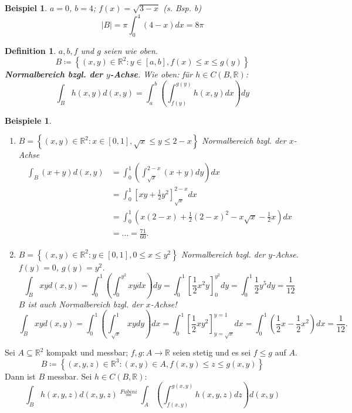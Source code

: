 \documentclass[12pt]{extreport} %
\newcommand{\R}{\mathbb{R}}
\theoremstyle{named}
\theoremstyle{nnamed}
\theoremstyle{itshape}
\newtheorem*{definition}{Definition}
\theoremstyle{normal}
\newtheorem*{beispiel*}{Beispiel}
\newtheorem*{beispiele}{Beispiele}
\begin{document}
\begin{beispiel*}
	$a = 0$, $b = 4$; $f(x) = \sqrt{3 - x}$ (s. Bsp. b)
	$$ |B| = \pi \int_{0}^{4} (4 - x) dx = 8 \pi $$	
\end{beispiel*}

\begin{definition}
	$a, b, f$ und $g$ seien wie oben.
	$$ B \coloneqq \left\{ (x, y) \in \R^{2} \colon y \in [a, b], f(x) \leq x \leq g(y) \right\} $$
	\textbf{Normalbereich bzgl. der $y$-Achse}. Wie oben: für $h \in C(B, \R)$:
	$$ \int_{B} h(x, y) d(x, y) = \int_{a}^{b} \left( \int_{f(y)}^{g(y)} h(x, y) dx \right) dy $$ %
\end{definition}


\begin{beispiele} ~\
	\begin{enumerate}
		\item $B = \left\{ (x, y) \in \R^{2} \colon x \in [0, 1], \sqrt{x} \leq y \leq 2 - x \right\}$ Normalbereich bzgl. der $x$-Achse
			\begin{align*} %
				\int_{B} (x + y) d(x, y) & = \int_{0}^{1} \left( \int_{\sqrt{x}}^{2-x} (x+y) dy \right) dx \\
				& = \int_{0}^{1} \left[ xy + \frac{1}{2} y^{2} \right]_{\sqrt{x}}^{2-x} dx \\
				& = \int_{0}^{1} \left( x ( 2 - x) + \frac{1}{2} \left( 2 - x \right)^{2} - x \sqrt{x} - \frac{1}{2} x \right) dx \\
				& = \dotsc = \frac{71}{60}.
			\end{align*} 
		\item $B = \left\{ (x, y) \in \R^{2} \colon y \in [0, 1], 0 \leq x \leq y^{2} \right\}$ Normalbereich bzgl. der $y$-Achse. $f(y) = 0$, $g(y) = y^{2}$.
			$$ \int_{B} xy d(x, y) = \int_{0}^{1} \left( \int_{0}^{y^{2}} xy dx \right) dy = \int_{0}^{1} \left[ \frac{1}{2} x^{2} y \right]_{0}^{y^{2}} dy = \int_{0}^{1} \frac{1}{2} y^{5} dy = \frac{1}{12} $$ %
			$B$ ist auch Normalbereich bzgl. der $x$-Achse! %
			$$ \int_{B} xy d(x, y) = \int_{0}^{1} \left( \int_{\sqrt{x}}^{1} xy dy \right) dx = \int_{0}^{1} \left[ \frac{1}{2} x y^{2} \right]_{y=\sqrt{x}}^{y=1} dx = \int_{0}^{1} \left( \frac{1}{2} x - \frac{1}{2} x^{2} \right) dx = \frac{1}{12}. $$
	\end{enumerate}	
\end{beispiele}


Sei $A \subseteq \R^{2}$ kompakt und messbar; $f, g \colon A \rightarrow \R$ seien stetig und es sei $f \leq g$ auf $A$.
	$$ B \coloneqq \left\{ (x,y,z) \in \R^{3} \colon (x,y) \in A, f(x,y) \leq z \leq g(x,y) \right\} $$
Dann ist $B$ messbar. Sei $h \in C(B, \R)$: %
	$$ \int_{B} h(x,y,z) d(x,y,z) \overset{Fubini}{=} \int_{A} \left( \int_{f(x,y)}^{g(x,y)} h(x,y,z) dz \right) d(x,y) $$
\end{document}
